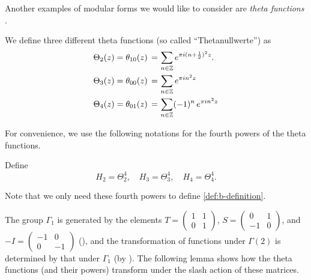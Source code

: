 Another examples of modular forms we would like to consider are \emph{theta functions} \cite[Section~3.1]{1-2-3}.
\begin{definition}\label{def:th00-th01-th10}\leanok
We define three different theta functions (so called ``Thetanullwerte'') as
\begin{align}
  \Theta_{2}(z) = \theta_{10}(z)\,=\, & \sum_{n\in\mathbb{Z}}e^{\pi i (n+\frac12)^2 z}. \notag \\
  \Theta_{3}(z) = \theta_{00}(z)\,=\, & \sum_{n\in\mathbb{Z}}e^{\pi i n^2 z} \notag \\
  \Theta_{4}(z) = \theta_{01}(z)\,=\, & \sum_{n\in\mathbb{Z}}(-1)^n\,e^{\pi i n^2 z} \notag \\
\end{align}
\end{definition}

For convenience, we use the following notations for the fourth powers of the theta functions.
\begin{definition}\label{def:H2-H3-H4}\leanok
Define
\begin{equation}
    H_2 = \Theta_2^4, \quad H_3 = \Theta_3^4, \quad H_4 = \Theta_4^4. \label{eqn:H2-H3-H4}
\end{equation}
\end{definition}
Note that we only need these fourth powers to define \eqref{def:b-definition}.

The group $\Gamma_1$ is generated by the elements $T=\left(\begin{smallmatrix}1&1\\0&1\end{smallmatrix}\right)$, $S=\left(\begin{smallmatrix}0&1\\-1&0\end{smallmatrix}\right)$, and $-I = \left(\begin{smallmatrix}-1&0\\0&-1\end{smallmatrix}\right)$ (), and the transformation of functions under $\Gamma(2)$ is determined by that under $\Gamma_1$ (by ).
The following lemma shows how the theta functions (and their powers) transform under the slash action of these matrices.

